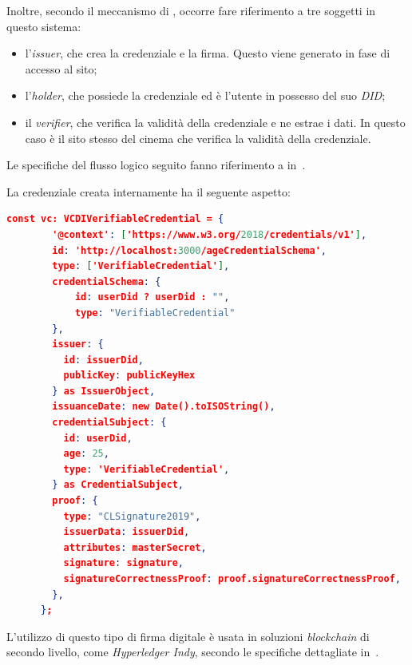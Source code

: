 Inoltre, secondo il meccanismo di , occorre fare riferimento a tre soggetti in questo sistema:
\begin{itemize}
    \item l'\textit{issuer}, che crea la credenziale e la firma. Questo viene generato in fase di accesso al sito;
    \item l'\textit{holder}, che possiede la credenziale ed è l'utente in possesso del suo \textit{DID};
    \item il \textit{verifier}, che verifica la validità della credenziale e ne estrae i dati. In questo caso è il sito stesso del cinema che verifica la validità della credenziale.
\end{itemize}

Le specifiche del flusso logico seguito fanno riferimento a in~\cite{site:clsignature2}.

La credenziale creata internamente ha il seguente aspetto:
\begin{lstlisting}[language=json]
    const vc: VCDIVerifiableCredential = {
        '@context': ['https://www.w3.org/2018/credentials/v1'],
        id: 'http://localhost:3000/ageCredentialSchema',
        type: ['VerifiableCredential'],
        credentialSchema: { 
            id: userDid ? userDid : "",
            type: "VerifiableCredential"
        },        
        issuer: {
          id: issuerDid,
          publicKey: publicKeyHex 
        } as IssuerObject,
        issuanceDate: new Date().toISOString(),
        credentialSubject: {
          id: userDid,
          age: 25,
          type: 'VerifiableCredential',
        } as CredentialSubject,
        proof: {
          type: "CLSignature2019", 
          issuerData: issuerDid, 
          attributes: masterSecret,
          signature: signature,
          signatureCorrectnessProof: proof.signatureCorrectnessProof,
        },
      };
\end{lstlisting}
L'utilizzo di questo tipo di firma digitale è usata in soluzioni \textit{blockchain} di secondo livello, come \textit{Hyperledger Indy}, 
secondo le specifiche dettagliate in~\cite{site:clsignature}. \\

